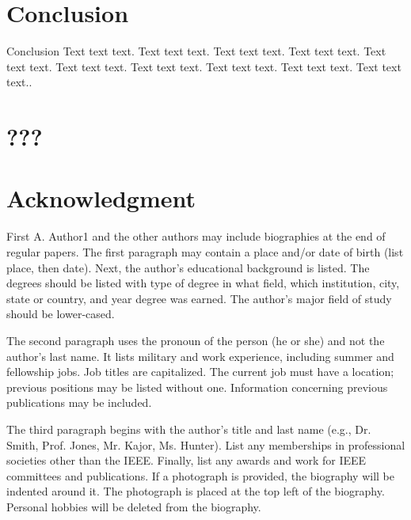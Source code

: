 \documentclass[journal]{IEEEtranTIE}
\begin{document}
\section{Conclusion}

Conclusion Text text text. Text text text. Text text text. Text text
text. Text text text. Text text text. Text text text. Text text text.
Text text text. Text text text..






\appendix


\section*{???}


\section*{Acknowledgment}






	
	
\begin{IEEEbiography}
{First A. Author1} and the other authors may include biographies at the end of regular papers. The first paragraph may contain a place and/or date of birth (list place, then date). Next, the author's educational background is listed. The degrees should be listed with type of degree in what field, which institution, city, state or country, and year degree was earned. The author's major field of study should be lower-cased.

The second paragraph uses the pronoun of the person (he or she) and not the author's last name. It lists military and work experience, including summer and fellowship jobs. Job titles are capitalized. The current job must have a location; previous positions may be listed without one. Information concerning previous publications may be included.

The third paragraph begins with the author's title and last name (e.g., Dr. Smith, Prof. Jones, Mr. Kajor, Ms. Hunter). List any memberships in professional societies other than the IEEE. Finally, list any awards and work for IEEE committees and publications. If a photograph is provided, the biography will be indented around it. The photograph is placed at the top left of the biography. Personal hobbies will be deleted from the biography.
\end{IEEEbiography}
\end{document}
